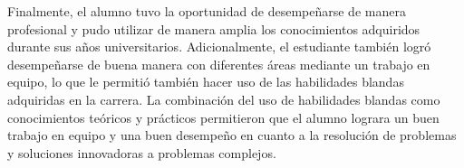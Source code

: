   Finalmente, el alumno tuvo la oportunidad de desempeñarse de manera profesional y pudo utilizar de manera amplia los conocimientos adquiridos durante sus años universitarios. Adicionalmente, el estudiante también logró desempeñarse de buena manera con diferentes áreas mediante un trabajo en equipo, lo que le permitió también hacer uso de las habilidades blandas adquiridas en la carrera. La combinación del uso de habilidades blandas como conocimientos teóricos y prácticos permitieron que el alumno lograra un buen trabajo en equipo y una buen desempeño en cuanto a la resolución de problemas y soluciones innovadoras a problemas complejos.